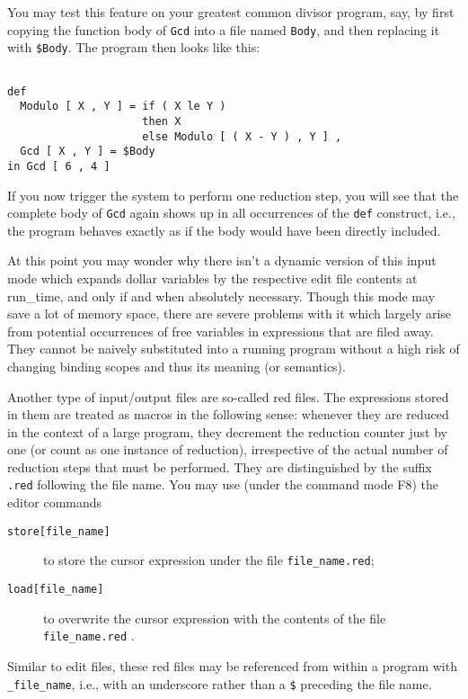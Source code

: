 You may test this feature on your {\mys greatest common divisor program}, say,
by first copying the function body of
{\tt Gcd} into a file named {\tt Body}, and then replacing it with 
{\tt \$Body}. The program then looks like this: 
\begin{verbatim}

def 
  Modulo [ X , Y ] = if ( X le Y )
                     then X
                     else Modulo [ ( X - Y ) , Y ] ,
  Gcd [ X , Y ] = $Body
in Gcd [ 6 , 4 ]

\end{verbatim}
If you now trigger the system to
 perform one reduction step, you will see that the complete body of
{\tt Gcd}  again shows up in  all occurrences of the {\tt def} construct,
i.e., the program behaves exactly as if the body would have been
directly included.

At this point you may wonder why there isn't a dynamic version of this input
mode which expands dollar variables by the respective edit file contents
 at run\_time, and only if and when absolutely necessary. Though this mode may
save a lot of memory space, there are severe problems with it
which largely arise from potential occurrences of free variables in expressions
that are filed away. They cannot be naively substituted into a running program
without a high risk of changing binding scopes and thus its meaning 
(or semantics). 

Another type of input/output files are so-called
{\mys red files}. The \kir expressions stored in them are treated as 
{\mys macros} in the following sense: whenever they are reduced in the 
context of a large program, they decrement the {\mys reduction counter}
just by one (or count as one instance of reduction), irrespective of the
actual number of reduction steps that must 
be performed. They are distinguished by the suffix {\tt .red} 
following the file name. You may use (under the command mode F8) 
the {\mys editor commands}
\begin{description}
\item[{\tt store[file\_name]}] to store the cursor expression under
the file {\tt file\_name.red};
\item[{\tt load[file\_name]}] to  overwrite the cursor expression with
 the contents of the file {\tt file\_name.red} .
\end{description}
Similar to edit files, these red files may be referenced from within a
 program with
{\tt \_file\_name}, i.e., with an underscore rather than a {\tt \$}
preceding the file name.

